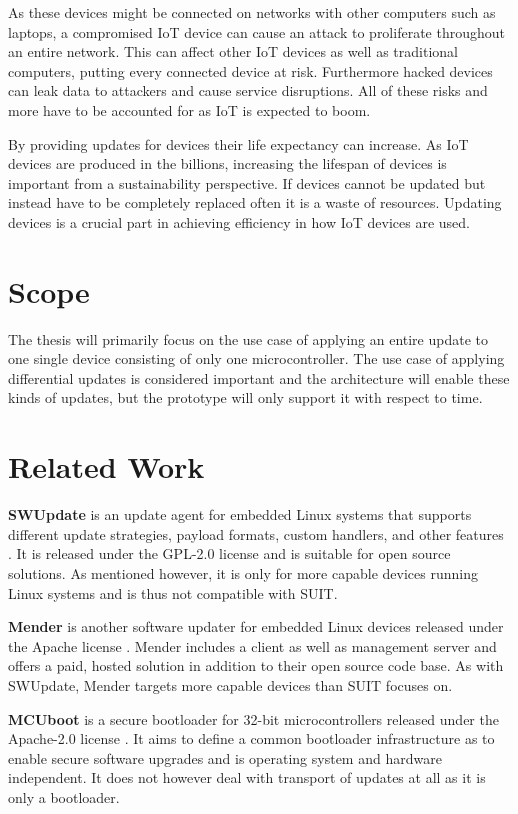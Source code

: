 \documentclass[0-thesis.tex]{subfiles}
\begin{document}
As these devices might be connected on networks with other computers such as laptops, a
compromised IoT device can cause an attack to proliferate throughout an entire network.
This can affect other IoT devices as well as traditional computers, putting every
connected device at risk. Furthermore hacked devices can leak data to attackers and cause
service disruptions. All of these risks and more have to be accounted for as IoT is
expected to boom.

By providing updates for devices their life expectancy can increase. As IoT devices are
produced in the billions, increasing the lifespan of devices is important from a
sustainability perspective. If devices cannot be updated but instead have to be completely
replaced often it is a waste of resources. Updating devices is a crucial part in achieving
efficiency in how IoT devices are used.

\section{Scope}
\label{sec:scope}
The thesis will primarily focus on the use case of applying an entire update to one single
device consisting of only one microcontroller. The use case of applying differential
updates is considered important and the architecture will enable these kinds of updates,
but the prototype will only support it with respect to time.

\section{Related Work}
\label{sec:related-work}
\textbf{SWUpdate} is an update agent for embedded Linux systems that supports different
update strategies, payload formats, custom handlers, and other features
\parencite{swupdate}. It is released under the GPL-2.0 license and is suitable for open
source solutions. As mentioned however, it is only for more capable devices running Linux
systems and is thus not compatible with SUIT.

\textbf{Mender} is another software updater for embedded Linux devices released under the
Apache license \parencite{mender}. Mender includes a client as well as management server
and offers a paid, hosted solution in addition to their open source code base. As with
SWUpdate, Mender targets more capable devices than SUIT focuses on.

\textbf{MCUboot} is a secure bootloader for 32-bit microcontrollers released under the
Apache-2.0 license \parencite{MCUboot}. It aims to define a common bootloader
infrastructure as to enable secure software upgrades and is operating system and hardware
independent. It does not however deal with transport of updates at all as it is only a
bootloader.
\end{document}
